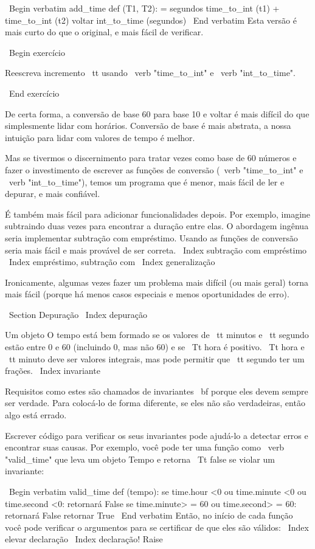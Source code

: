 \documentclass[10pt]{book}
\begin{document}
\begin {itemize}
{{{{{{{{{{{{{{\ Begin {verbatim}
add_time def (T1, T2):
    = segundos time_to_int (t1) + time_to_int (t2)
    voltar int_to_time (segundos)
\ End {verbatim}
%
Esta versão é mais curto do que o original, e mais fácil de verificar.

\ Begin {} exercício

Reescreva {incremento \ tt} usando \ verb "time_to_int" e \ verb "int_to_time".

\ End {} exercício

De certa forma, a conversão de base 60 para base 10 e voltar é mais difícil
do que simplesmente lidar com horários. Conversão de base é mais abstrata, a nossa
intuição para lidar com valores de tempo é melhor.

Mas se tivermos o discernimento para tratar vezes como base de 60 números e fazer
o investimento de escrever as funções de conversão (\ verb "time_to_int"
e \ verb "int_to_time"), temos um programa que é menor, mais fácil de
ler e depurar, e mais confiável.

É também mais fácil para adicionar funcionalidades depois. Por exemplo, imagine
subtraindo duas vezes para encontrar a duração entre elas. O
abordagem ingênua seria implementar subtração com empréstimo.
Usando as funções de conversão seria mais fácil e mais provável de ser
correta.
\ Index {subtração com empréstimo}
\ Index {empréstimo, subtração com}
\ Index {generalização}

Ironicamente, algumas vezes fazer um problema mais difícil (ou mais geral) torna
mais fácil (porque há menos casos especiais e menos oportunidades
de erro).


\ Section {} Depuração
\ Index {depuração}

Um objeto O tempo está bem formado se os valores de {\ tt minutos} e {\ tt
segundo} estão entre 0 e 60 (incluindo 0, mas não 60) e se 
{\ Tt hora} é positivo. {\ Tt hora} e {\ tt minuto} deve ser
valores integrais, mas pode permitir que {\ tt segundo} ter um
frações.
\ Index {} invariante

Requisitos como estes são chamados de invariantes {\ bf} porque
eles devem sempre ser verdade. Para colocá-lo de forma diferente, se eles
não são verdadeiras, então algo está errado.

Escrever código para verificar os seus invariantes pode ajudá-lo a detectar erros
e encontrar suas causas. Por exemplo, você pode ter uma função
como \ verb "valid_time" que leva um objeto Tempo e retorna
{\ Tt false} se violar um invariante:

\ Begin {verbatim}
valid_time def (tempo):
    se time.hour <0 ou time.minute <0 ou time.second <0:
        retornará False
    se time.minute> = 60 ou time.second> = 60:
        retornará False
    retornar True
\ End {verbatim}
%
Então, no início de cada função você pode verificar o
argumentos para se certificar de que eles são válidos:
\ Index {elevar declaração}
\ Index {declaração! Raise}

}}}}}}}}}}}}}}
\end{itemize}
\end{document}
